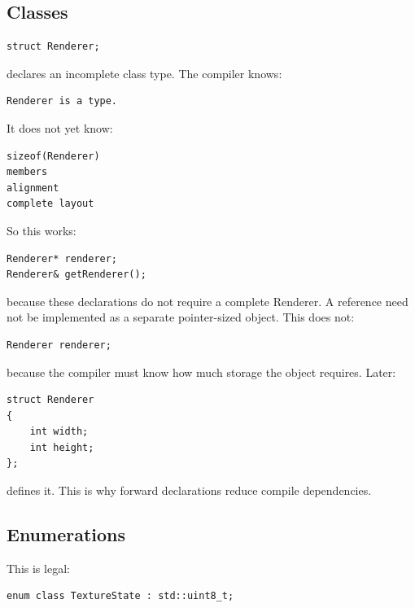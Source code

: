 \subsection{Classes}\label{01-foundations-i-ch002-classes}

\hypertarget{01-foundations-i-ch002-classes}{}

\begin{verbatim}
struct Renderer;
\end{verbatim}

declares an incomplete class type. The compiler knows:

\begin{verbatim}
Renderer is a type.
\end{verbatim}

It does not yet know:

\begin{verbatim}
sizeof(Renderer)
members
alignment
complete layout
\end{verbatim}

So this works:

\begin{verbatim}
Renderer* renderer;
Renderer& getRenderer();
\end{verbatim}

because these declarations do not require a complete Renderer. A reference need not be implemented as a separate pointer-sized object. This does not:

\begin{verbatim}
Renderer renderer;
\end{verbatim}

because the compiler must know how much storage the object requires. Later:

\begin{verbatim}
struct Renderer
{
    int width;
    int height;
};
\end{verbatim}

defines it. This is why forward declarations reduce compile dependencies.

\subsection{Enumerations}\label{01-foundations-i-ch002-enumerations}

\hypertarget{01-foundations-i-ch002-enumerations}{}

This is legal:

\begin{verbatim}
enum class TextureState : std::uint8_t;
\end{verbatim}

